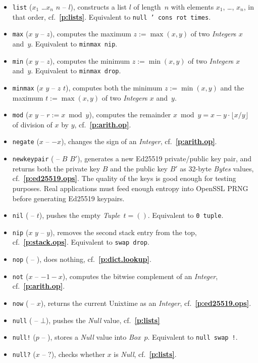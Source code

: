 \documentclass[12pt,oneside]{article}
\def\refpoint#1{{\rm\textbf{\ref{#1}}}}
\let\ptref=\refpoint
\begin{document}
\begin{itemize}
\item {\tt list} ($x_1$ \dots $x_n$ $n$ -- $l$), constructs a list $l$ of length~$n$ with elements $x_1$, \ldots, $x_n$, in that order, cf.~\ptref{p:lists}. Equivalent to {\tt null ' cons rot times}.
\item {\tt max} ($x$ $y$ -- $z$), computes the maximum $z:=\max(x,y)$ of two {\em Integer\/}s $x$ and~$y$. Equivalent to {\tt minmax nip}.
\item {\tt min} ($x$ $y$ -- $z$), computes the minimum $z:=\min(x,y)$ of two {\em Integer\/}s $x$ and~$y$. Equivalent to {\tt minmax drop}.
\item {\tt minmax} ($x$ $y$ -- $z$ $t$), computes both the minimum $z:=\min(x,y)$ and the maximum $t:=\max(x,y)$ of two {\em Integer\/}s $x$ and~$y$.
\item {\tt mod} ($x$ $y$ -- $r:=x\bmod y$), computes the remainder $x\bmod y=x-y\cdot\lfloor x/y\rfloor$ of division of $x$ by $y$, cf.~\ptref{p:arith.op}.
\item {\tt negate} ($x$ -- $-x$), changes the sign of an {\em Integer}, cf.~\ptref{p:arith.op}.
\item {\tt newkeypair} ( -- $B$ $B'$), generates a new Ed25519 private/public key pair, and returns both the private key $B$ and the public key $B'$ as 32-byte {\em Bytes\/} values, cf.~\ptref{p:ed25519.ops}. The quality of the keys is good enough for testing purposes. Real applications must feed enough entropy into OpenSSL PRNG before generating Ed25519 keypairs.
\item {\tt nil} ( -- $t$), pushes the empty {\em Tuple\/}~$t=()$. Equivalent to {\tt 0 tuple}.
\item {\tt nip} ($x$ $y$ -- $y$), removes the second stack entry from the top, cf.~\ptref{p:stack.ops}. Equivalent to {\tt swap drop}.
\item {\tt nop} ( -- ), does nothing, cf.~\ptref{p:dict.lookup}.
\item {\tt not} ($x$ -- $-1-x$), computes the bitwise complement of an {\em Integer}, cf.~\ptref{p:arith.op}.
\item {\tt now} ( -- $x$), returns the current Unixtime as an {\em Integer}, cf.~\ptref{p:ed25519.ops}.
\item {\tt null} ( -- $\bot$), pushes the {\em Null\/} value, cf.~\ptref{p:lists}
\item {\tt null!} ($p$ -- ), stores a {\em Null\/} value into {\em Box\/}~$p$. Equivalent to {\tt null swap !}.
\item {\tt null?} ($x$ -- $?$), checks whether $x$ is {\em Null}, cf.~\ptref{p:lists}.

\end{itemize}
\end{document}
